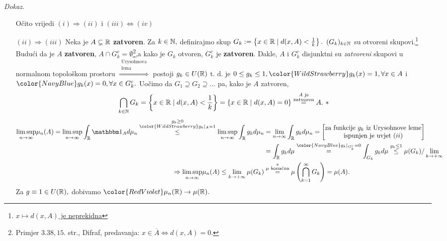 \documentclass{article}
\begin{document}
\textit{Dokaz.}
\begin{itemize}
    \item[] Očito vrijedi \(\boxed{(i)\Rightarrow (ii)}\) i \(\boxed{(iii)\Leftrightarrow (iv)}\)
    \item[\(\boxed{(ii)\Rightarrow (iii)}\)] Neka je \(A\subsetneq\Bbb R\) \textbf{zatvoren}. Za \(k\in\Bbb N,\) definirajmo skup \(G_k:=\left\{x\in\Bbb R\mid d(x,A)<\frac1k\right\}.\)  \((G_k)_{k\in\Bbb N}\) su otvoreni skupovi.\footnote[26]{\href{https://math.stackexchange.com/a/1155044/721644}{\(x\mapsto d(x,A)\) je neprekidna}} Budući da je \(A\) \textbf{zatvoren}, \(A\cap G_k^c=\emptyset\)\footnote[27]{Primjer \(3.38,15.\) str., Difraf, predavanja: \(x\in\overline A\Leftrightarrow d(x,A)=0\).},a kako je \(G_k\) otvoren, \(G_k^c\) je \textbf{zatvoren}. Dakle, \(A\) i \(G_k^c\) disjunktni su \emph{zatvoreni} skupovi u normalnom topološkom prostoru \(\overset{\substack{\text{Urysohnova}\\\text{lema}}}{\Rightarrow}\) postoji \(g_k\in U(\Bbb R)\) t. d. je \(0\le g_k\le 1,{\color{WildStrawberry}g_k(x)=1,\forall x\in A}\) i \({\color{NavyBlue}g_k(x)=0,\forall x\in G_k^c}.\) Uočimo da \(G_1\supseteq G_2\supseteq\ldots\) pa, kako je \(A\) zatvoren,\[\bigcap_{k\in\Bbb N}G_k=\left\{x\in\Bbb R\mid d(x,A)<\frac1k\right\}=\left\{x\in\Bbb R\mid d(x,A)=0\right\}\overset{\substack{A\text{ je}\\\text{zatvoren}}}{=}A.\text{	\textasteriskcentered}\]  \[\begin{aligned}\underset{n\to\infty}{\lim\sup }\mu_n(A)=\underset{n\to\infty}{\limsup}\int_\Bbb R\mathbbm 1_Ad\mu_n\overset{\substack{g_k\ge 0\\{\color{WildStrawberry}g_k\mid_A=1}}}{\le}\underset{n\to\infty}{\lim\sup }\int_{\Bbb R}g_kd\mu_n&=\lim_{n\to\infty}\int_{\Bbb R}g_kd\mu_n=\begin{bmatrix}\text{za funkcije }g_k\text{ iz Urysohnove leme}\\\text{ispunjen je uvjet }(ii)\end{bmatrix}\\&=\int_{\Bbb R}g_kd\mu\overset{{\color{NavyBlue}g_k\mid_{G_k^c}=0}}{=}\int_{G_k}g_kd\mu\overset{g_k\le1}{\le}\mu(G_k)/\lim_{k\to+\infty}\\\Rightarrow\underset{n\to\infty}{\lim\sup }\mu_n(A)\le\lim_{k\to+\infty}\mu(G_k)&\overset{\substack{\text{\textasteriskcentered}\\\mu\text{ konačna}}}{=}\mu\left(\bigcap_{k=1}^\infty G_k\right)=\mu(A).\end{aligned}\] Za \(g\equiv 1\in U(\Bbb R),\) dobivamo \({\color{RedViolet}\mu_n(\Bbb R)\to\mu(\Bbb R)}.\)

\end{itemize}
\end{document}
